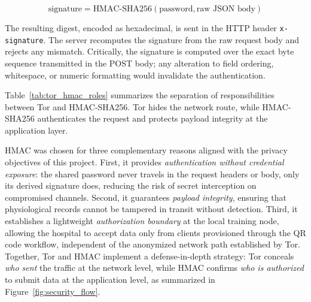 \documentclass[12pt]{article}
\begin{document}
\begin{equation}
\text{signature} = \text{HMAC-SHA256}(\text{password}, \text{raw JSON body})
\end{equation}

The resulting digest, encoded as hexadecimal, is sent in the HTTP header \texttt{x-signature}. The server recomputes the signature from the raw request body and rejects any mismatch. Critically, the signature is computed over the exact byte sequence transmitted in the POST body; any alteration to field ordering, whitespace, or numeric formatting would invalidate the authentication.

Table~\ref{tab:tor_hmac_roles} summarizes the separation of responsibilities between Tor and HMAC-SHA256. Tor hides the network route, while HMAC-SHA256 authenticates the request and protects payload integrity at the application layer.

\begin{table}[H]
\centering
\caption{Separation of responsibilities between Tor and HMAC-SHA256.}
\label{tab:tor_hmac_roles}
\end{table}

HMAC was chosen for three complementary reasons aligned with the privacy objectives of this project. First, it provides \textit{authentication without credential exposure}: the shared password never travels in the request headers or body, only its derived signature does, reducing the risk of secret interception on compromised channels. Second, it guarantees \textit{payload integrity}, ensuring that physiological records cannot be tampered in transit without detection. Third, it establishes a lightweight \textit{authorization boundary} at the local training node, allowing the hospital to accept data only from clients provisioned through the QR code workflow, independent of the anonymized network path established by Tor. Together, Tor and HMAC implement a defense-in-depth strategy: Tor conceals \textit{who sent} the traffic at the network level, while HMAC confirms \textit{who is authorized} to submit data at the application level, as summarized in Figure~\ref{fig:security_flow}.
\end{document}

